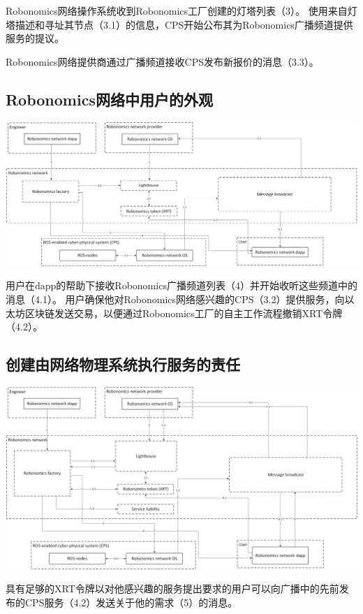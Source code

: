 \documentclass[UTF8]{article}
\begin{document}
Robonomics网络操作系统收到Robonomics工厂创建的灯塔列表（3）。 使用来自灯塔描述和寻址其节点（3.1）的信息，CPS开始公布其为Robonomics广播频道提供服务的提议。

Robonomics网络提供商通过广播频道接收CPS发布新报价的消息（3.3）。

\subsection{Robonomics网络中用户的外观}

\includegraphics[width=1\textwidth]{step-by-step-4.png} 

用户在dapp的帮助下接收Robonomics广播频道列表（4）并开始收听这些频道中的消息（4.1）。 用户确保他对Robonomics网络感兴趣的CPS（3.2）提供服务，向以太坊区块链发送交易，以便通过Robonomics工厂的自主工作流程撤销XRT令牌（4.2）。

\subsection{创建由网络物理系统执行服务的责任}

\includegraphics[width=1\textwidth]{step-by-step-5.png} 

具有足够的XRT令牌以对他感兴趣的服务提出要求的用户可以向广播中的先前发布的CPS服务（4.2）发送关于他的需求（5）的消息。
\end{document}
